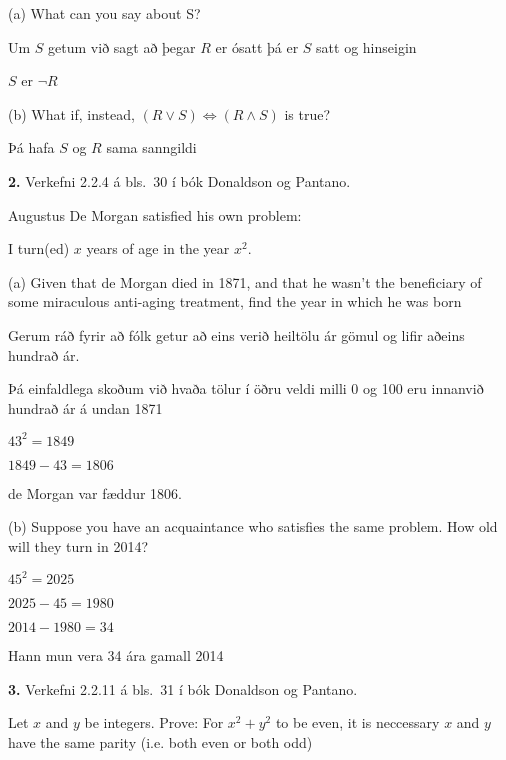\documentclass[12pt]{article}
\begin{document}
(a) What can you say about S?

Um $S$ getum við sagt að þegar $R$ er ósatt þá er $S$ satt og hinseigin

$S$ er $\lnot R$

(b) What if, instead, $(R\lor S) \Longleftrightarrow (R\land S)$ is true?

Þá hafa $S$ og $R$ sama sanngildi

\smallskip
\bigskip
\bigskip
\bigskip
\bigskip
\bigskip

{\bf 2.}  Verkefni 2.2.4 á bls.~30 í bók Donaldson og Pantano.

Augustus De Morgan satisfied his own problem:

\begin{center}
	I turn(ed) $x$ years of age in the year $x^2$.
\end{center}


(a) Given that de Morgan died in 1871, and that he wasn’t the beneficiary of some miraculous anti-aging treatment, find the year in which he was born

Gerum ráð fyrir að fólk getur að eins verið heiltölu ár gömul og lifir aðeins hundrað ár.

Þá einfaldlega skoðum við hvaða tölur í öðru veldi milli 0 og 100 eru innanvið hundrað ár á undan 1871

$43^2 =  1849$

$1849 - 43 = 1806$

de Morgan var fæddur 1806.

\smallskip

(b) Suppose you have an acquaintance who satisfies the same problem. How old will they turn in 2014?


$45^2 = 2025$

$2025 - 45 = 1980$

$2014 - 1980 = 34$

Hann mun vera 34 ára gamall 2014

\smallskip

\newpage

{\bf 3.}  Verkefni 2.2.11 á bls.~31 í bók Donaldson og Pantano.

Let $x$ and $y$ be integers. Prove: For $x^2 + y^2$ to be even, it is neccessary $x$ and $y$ have the same parity (i.e. both even or both odd)




\end{document}
